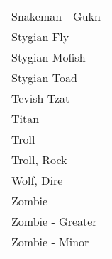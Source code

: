 \documentclass[twoside]{book}
\begin{document}
\begin{longtable}{p{1.25in}}
  \raggedright
           Snakeman - Gukn 
  \tabularnewline
      
  \raggedright
           Stygian Fly 
  \tabularnewline
      
  \raggedright
           Stygian Mofish 
  \tabularnewline
      
  \raggedright
           Stygian Toad 
  \tabularnewline
      
  \raggedright
           Tevish-Tzat 
  \tabularnewline
      
  \raggedright
           Titan 
  \tabularnewline
      
  \raggedright
           Troll 
  \tabularnewline
      
  \raggedright
           Troll, Rock 
  \tabularnewline
      
  \raggedright
           Wolf, Dire 
  \tabularnewline
      
  \raggedright
           Zombie 
  \tabularnewline
      
  \raggedright
           Zombie - Greater 
  \tabularnewline
      
  \raggedright
           Zombie - Minor 
  \tabularnewline
      
\end{longtable}
    
\end{document}
